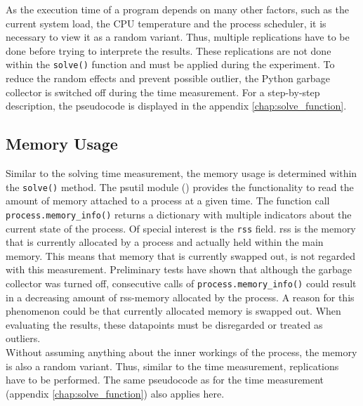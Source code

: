 \documentclass[./\jobname.tex]{subfiles}
\begin{document}
As the execution time of a program depends on many other factors, such as the current system load, the CPU temperature and the process scheduler, it is necessary to view it as a random variant. Thus, multiple replications have to be done before trying to interprete the results. These replications are not done within the \colorbox{light-gray}{\lstinline[basicstyle=\ttfamily\color{black}]|solve()|} function and must be applied during the experiment. To reduce the random effects and prevent possible outlier, the Python garbage collector is switched off during the time measurement. For a step-by-step description, the pseudocode is displayed in the appendix \ref{chap:solve_function}. 

\subsection{Memory Usage}
\label{chap:metric_mem}
Similar to the solving time measurement, the memory usage is determined within the \colorbox{light-gray}{\lstinline[basicstyle=\ttfamily\color{black}]|solve()|} method. The psutil module (\cite{rodola_psutil_2020}) provides the functionality to read the amount of memory attached to a process at a given time. The function call \colorbox{light-gray}{\lstinline[basicstyle=\ttfamily\color{black}]|process.memory_info()|} returns a dictionary with multiple indicators about the current state of the process. Of special interest is the \colorbox{light-gray}{\lstinline[basicstyle=\ttfamily\color{black}]|rss|} field. \gls{rss} is the memory that is currently allocated by a process and actually held within the main memory. This means that memory that is currently swapped out, is not regarded with this measurement. Preliminary tests have shown that although the garbage collector was turned off, consecutive calls of \colorbox{light-gray}{\lstinline[basicstyle=\ttfamily\color{black}]|process.memory_info()|} could result in a decreasing amount of rss-memory allocated by the process. A reason for this phenomenon could be that currently allocated memory is swapped out. When evaluating the results, these datapoints must be disregarded or treated as outliers. \\

Without assuming anything about the inner workings of the process, the memory is also a random variant. Thus, similar to the time measurement, replications have to be performed. The same pseudocode as for the time measurement (appendix \ref{chap:solve_function}) also applies here.
\end{document}
